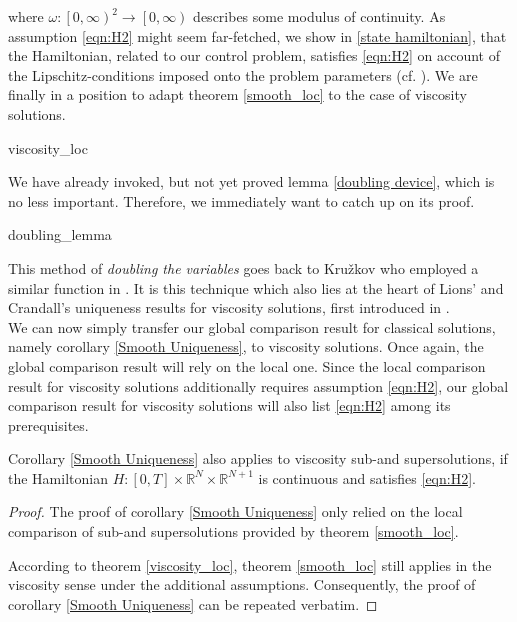 		 where $ \omega : \left[0, \infty \right)^2 \to \left[0, \infty \right) $ describes some modulus of continuity. As assumption \eqref{eqn:H2} 
		 might seem far-fetched, we show in \ref{state hamiltonian}, that the Hamiltonian, related to our control problem, satisfies \eqref{eqn:H2} on account of the Lipschitz-conditions imposed onto the problem parameters (cf. \cite[p.~167]{zhou}). We are finally in a position to adapt theorem \ref{smooth_loc} to the case of viscosity solutions.
		 
		 {viscosity_loc}
		 
		 We have already invoked, but not yet proved lemma \ref{doubling device}, which is no less important. Therefore, we immediately want to catch up on its proof.
		 
		 {doubling_lemma}
		 
		 This method of \emph{doubling the variables} goes back to Kru\v{z}kov who employed a similar function in \cite{kruvzkov}. It is this technique which also lies at the heart of Lions' and Crandall's uniqueness results for viscosity solutions, first introduced in \cite{lions}. \\
		 
		 We can now simply transfer our global comparison result for classical solutions, namely corollary \ref{Smooth Uniqueness}, to viscosity solutions. Once again, the global comparison result will rely on the local one. Since the local comparison result for viscosity solutions additionally requires assumption  \eqref{eqn:H2}, our global comparison result for viscosity solutions will also list \eqref{eqn:H2} among its prerequisites.
		  
		  \begin{corollary}
		  	\label{Viscosity Uniqueness}
		  	Corollary \ref{Smooth Uniqueness} also applies to viscosity sub-and supersolutions, if the Hamiltonian $ H : \left[ 0, T \right] \times \mathbb{R}^{N} \times \mathbb{R}^{N+1} $ is continuous and satisfies \eqref{eqn:H2}.
		  	
		  	\begin{proof}
		  		The proof of corollary \ref{Smooth Uniqueness} only relied on the local comparison of sub-and supersolutions provided by theorem \ref{smooth_loc}. 
		  		
		  		According to theorem \ref{viscosity_loc}, theorem \ref{smooth_loc} still applies in the viscosity sense under the additional assumptions. Consequently, the proof of corollary \ref{Smooth Uniqueness} can be repeated verbatim.
		  	\end{proof}
		  \end{corollary}
		  